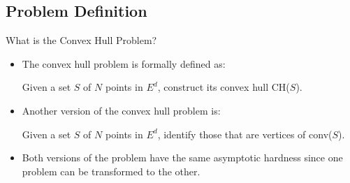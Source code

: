 \documentclass{beamer}
\begin{document}
\subsection{Problem Definition}
\begin{frame}{What is the Convex Hull Problem?}
    \begin{itemize}
        \item The convex hull problem is formally defined as:
        \begin{center}
        \begin{minipage}{0.75\textwidth}
          \begin{center}
            Given a set $S$ of $N$ points in $E^d$, construct its convex hull CH($S$).
          \end{center}
        \end{minipage}
      \end{center}
      \vspace{1 em}
      \item Another version of the convex hull problem is:
      \begin{center}
        \begin{minipage}{0.75\textwidth}
          \begin{center}
            Given a set $S$ of $N$ points in $E^d$, identify those that are vertices of conv($S$). 
          \end{center}
        \end{minipage}
      \end{center}
      \vspace{1 em}
      \item Both versions of the problem have the same asymptotic hardness since one problem can be 
      transformed to the other. 
    \end{itemize}    
\end{frame}




    
    
\end{document}
